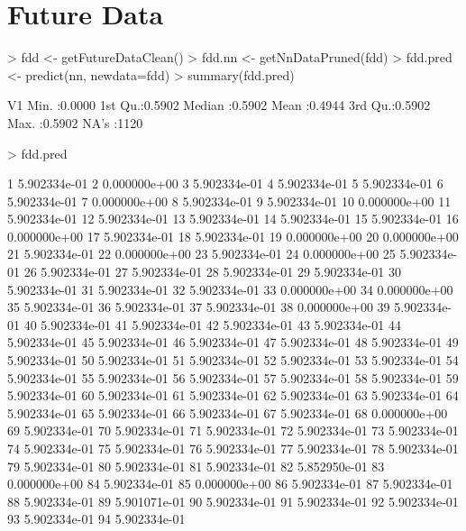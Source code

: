 \documentclass{article}
\begin{document}
\section*{Future Data}
\begin{Schunk}
\begin{Sinput}
> fdd <- getFutureDataClean()
> fdd.nn <- getNnDataPruned(fdd)
> fdd.pred <- predict(nn, newdata=fdd)
> summary(fdd.pred)
\end{Sinput}
\begin{Soutput}
       V1        
 Min.   :0.0000  
 1st Qu.:0.5902  
 Median :0.5902  
 Mean   :0.4944  
 3rd Qu.:0.5902  
 Max.   :0.5902  
 NA's   :1120    
\end{Soutput}
\begin{Sinput}
> fdd.pred
\end{Sinput}
\begin{Soutput}
             [,1]
1    5.902334e-01
2    0.000000e+00
3    5.902334e-01
4    5.902334e-01
5    5.902334e-01
6    5.902334e-01
7    0.000000e+00
8    5.902334e-01
9    5.902334e-01
10   0.000000e+00
11   5.902334e-01
12   5.902334e-01
13   5.902334e-01
14   5.902334e-01
15   5.902334e-01
16   0.000000e+00
17   5.902334e-01
18   5.902334e-01
19   0.000000e+00
20   0.000000e+00
21   5.902334e-01
22   0.000000e+00
23   5.902334e-01
24   0.000000e+00
25   5.902334e-01
26   5.902334e-01
27   5.902334e-01
28   5.902334e-01
29   5.902334e-01
30   5.902334e-01
31   5.902334e-01
32   5.902334e-01
33   0.000000e+00
34   0.000000e+00
35   5.902334e-01
36   5.902334e-01
37   5.902334e-01
38   0.000000e+00
39   5.902334e-01
40   5.902334e-01
41   5.902334e-01
42   5.902334e-01
43   5.902334e-01
44   5.902334e-01
45   5.902334e-01
46   5.902334e-01
47   5.902334e-01
48   5.902334e-01
49   5.902334e-01
50   5.902334e-01
51   5.902334e-01
52   5.902334e-01
53   5.902334e-01
54   5.902334e-01
55   5.902334e-01
56   5.902334e-01
57   5.902334e-01
58   5.902334e-01
59   5.902334e-01
60   5.902334e-01
61   5.902334e-01
62   5.902334e-01
63   5.902334e-01
64   5.902334e-01
65   5.902334e-01
66   5.902334e-01
67   5.902334e-01
68   0.000000e+00
69   5.902334e-01
70   5.902334e-01
71   5.902334e-01
72   5.902334e-01
73   5.902334e-01
74   5.902334e-01
75   5.902334e-01
76   5.902334e-01
77   5.902334e-01
78   5.902334e-01
79   5.902334e-01
80   5.902334e-01
81   5.902334e-01
82   5.852950e-01
83   0.000000e+00
84   5.902334e-01
85   0.000000e+00
86   5.902334e-01
87   5.902334e-01
88   5.902334e-01
89   5.901071e-01
90   5.902334e-01
91   5.902334e-01
92   5.902334e-01
93   5.902334e-01
94   5.902334e-01

\end{Soutput}
\end{Schunk}
\end{document}
